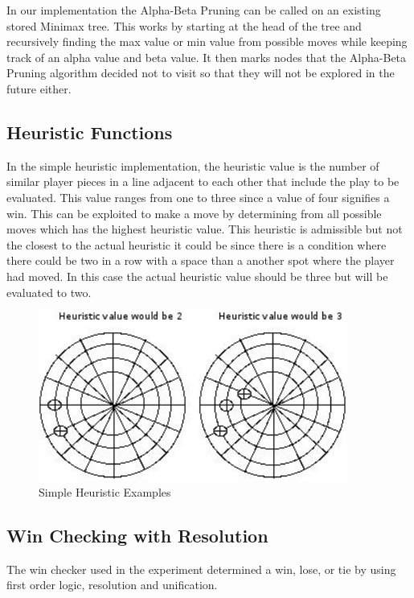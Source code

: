 \documentclass[12pt,letterpaper]{article}
\begin{document}
In our implementation the Alpha-Beta Pruning can be called on an existing stored Minimax tree. This works by starting at the head of the tree and recursively finding the max value or min value from possible moves while keeping track of an alpha value and beta value.  It then marks nodes that the Alpha-Beta Pruning algorithm decided not to visit so that they will not be explored in the future either. 

\subsection{Heuristic Functions}

In the simple heuristic implementation, the heuristic value is the number of similar player pieces in a line adjacent to each other that include the play to be evaluated. This value ranges from one to three since a value of four signifies a win. This can be exploited to make a move by determining from all possible moves which has the highest heuristic value. This heuristic is admissible but not the closest to the actual heuristic it could be since there is a condition where there could be two in a row with a space than a another spot where the player had moved. In this case the actual heuristic value should be three but will be evaluated to two.

\begin{figure}[h]
\begin{center}
\includegraphics[width=4in]{heu.png}
\end{center}
\caption{Simple Heuristic Examples}
\label{heuristicExample}
\end{figure}

\subsection{Win Checking with Resolution}
The win checker used in the experiment determined a win, lose, or tie by using first order logic, resolution and unification.
\end{document}
